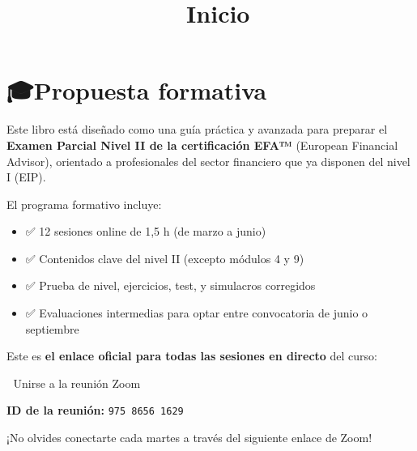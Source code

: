 \documentclass[
  letterpaper,
  DIV=11,
  numbers=noendperiod]{scrreprt}
\title{📘 \textbf{Inicio}}
\author{}
\date{}
\providecommand{\tightlist}{%
  \setlength{\itemsep}{0pt}\setlength{\parskip}{0pt}}\usepackage{longtable,booktabs,array}
\renewcommand*\contentsname{Tabla de contenidos}
\newcommand\contentsname{Tabla de contenidos}
\begin{document}
\maketitle

\renewcommand*\contentsname{Tabla de contenidos}
{
\hypersetup{linkcolor=}
\setcounter{tocdepth}{2}
\tableofcontents
}


\chapter{🎓Propuesta formativa}\label{propuesta-formativa}

Este libro está diseñado como una guía práctica y avanzada para preparar
el \textbf{Examen Parcial Nivel II de la certificación EFA™} (European
Financial Advisor), orientado a profesionales del sector financiero que
ya disponen del nivel I (EIP).

El programa formativo incluye:

\begin{itemize}
\tightlist
\item
  ✅ 12 sesiones online de 1,5 h (de marzo a junio)
\item
  ✅ Contenidos clave del nivel II (excepto módulos 4 y 9)
\item
  ✅ Prueba de nivel, ejercicios, test, y simulacros corregidos
\item
  ✅ Evaluaciones intermedias para optar entre convocatoria de junio o
  septiembre
\end{itemize}

\begin{tcolorbox}[enhanced jigsaw, toprule=.15mm, left=2mm, breakable, opacitybacktitle=0.6, toptitle=1mm, coltitle=black, arc=.35mm, leftrule=.75mm, bottomtitle=1mm, titlerule=0mm, title={📆 Enlace recurrente para las sesiones semanales}, rightrule=.15mm, opacityback=0, bottomrule=.15mm, colback=white, colframe=quarto-callout-warning-color-frame, colbacktitle=quarto-callout-warning-color!10!white]

Este es \textbf{el enlace oficial para todas las sesiones en directo}
del curso:

🔗 Unirse a la reunión Zoom

\textbf{ID de la reunión:} \texttt{975\ 8656\ 1629}

¡No olvides conectarte cada martes a través del siguiente enlace de
Zoom!

\end{tcolorbox}
\end{document}
